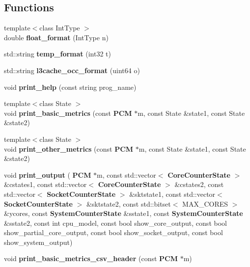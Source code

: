 \subsection*{Functions}
\begin{DoxyCompactItemize}
\item 
\mbox{\label{pcm_8cpp_afb78946f84b894fb4284e7b672cda23c}} 
{\footnotesize template$<$class Int\+Type $>$ }\\double {\bfseries float\+\_\+format} (Int\+Type n)
\item 
\mbox{\label{pcm_8cpp_aeebeb8e745c5a040d4be7740061e1f76}} 
std\+::string {\bfseries temp\+\_\+format} (int32 t)
\item 
\mbox{\label{pcm_8cpp_a72b1e8c5ff6ef33763687c1b3d0d5409}} 
std\+::string {\bfseries l3cache\+\_\+occ\+\_\+format} (uint64 o)
\item 
\mbox{\label{pcm_8cpp_aed15bac2c898efcc1f005764539f7970}} 
void {\bfseries print\+\_\+help} (const string prog\+\_\+name)
\item 
\mbox{\label{pcm_8cpp_a795b4dc0ba2bf103da3c14f6b77dd6a2}} 
{\footnotesize template$<$class State $>$ }\\void {\bfseries print\+\_\+basic\+\_\+metrics} (const \textbf{ P\+CM} $\ast$m, const State \&state1, const State \&state2)
\item 
\mbox{\label{pcm_8cpp_af757cd04841b07df5dabd064f9a0c371}} 
{\footnotesize template$<$class State $>$ }\\void {\bfseries print\+\_\+other\+\_\+metrics} (const \textbf{ P\+CM} $\ast$m, const State \&state1, const State \&state2)
\item 
\mbox{\label{pcm_8cpp_ad9c5ac2e5d822d7a58087aa93a6ddf12}} 
void {\bfseries print\+\_\+output} (\textbf{ P\+CM} $\ast$m, const std\+::vector$<$ \textbf{ Core\+Counter\+State} $>$ \&cstates1, const std\+::vector$<$ \textbf{ Core\+Counter\+State} $>$ \&cstates2, const std\+::vector$<$ \textbf{ Socket\+Counter\+State} $>$ \&sktstate1, const std\+::vector$<$ \textbf{ Socket\+Counter\+State} $>$ \&sktstate2, const std\+::bitset$<$ M\+A\+X\+\_\+\+C\+O\+R\+ES $>$ \&ycores, const \textbf{ System\+Counter\+State} \&sstate1, const \textbf{ System\+Counter\+State} \&sstate2, const int cpu\+\_\+model, const bool show\+\_\+core\+\_\+output, const bool show\+\_\+partial\+\_\+core\+\_\+output, const bool show\+\_\+socket\+\_\+output, const bool show\+\_\+system\+\_\+output)
\item 
\mbox{\label{pcm_8cpp_a84eb5866e9bc36d32e306f46d8c73955}} 
void {\bfseries print\+\_\+basic\+\_\+metrics\+\_\+csv\+\_\+header} (const \textbf{ P\+CM} $\ast$m)

\end{DoxyCompactItemize}
